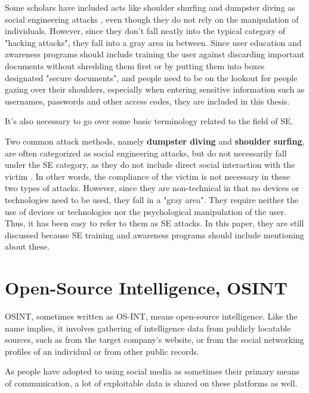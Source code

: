 Some scholars have included acts like shoulder shurfing and dumpster diving as social engineering attacks \citep{abiteboul}, even though they do not rely on the manipulation of individuals.  However, since they don't fall neatly into the typical category of "hacking attacks", they fall into a gray area in between. Since user education and awareness programs should include training the user against discarding important documents without shredding them first or by putting them into boxes designated "secure documents", and people need to be on the lookout for people gazing over their shoulders, especially when entering sensitive information such as usernames, passwords and other access codes, they are included in this thesis.

It's also necessary to go over some basic terminology related to the field of SE.

Two common attack methods, namely \textbf{dumpster diving} and \textbf{shoulder surfing}, are often categorized as social engineering attacks, but do not necessarily fall under the SE category, as they do not include direct social interaction with the victim \citep{wang_defining_2020}. In other words, the compliance of the victim is not necessary in these two types of attacks. However, since they are non-technical in that no devices or technologies need to be used, they fall in a "gray area". They require neither the use of devices or technologies nor the psychological manipulation of the user. Thus, it has been easy to refer to them as SE attacks. In this paper, they are still discussed because SE training and awareness programs should include mentioning about these.









\section{Open-Source Intelligence, OSINT}

OSINT, sometimes written as OS-INT, means open-source intelligence. Like the name implies, it involves gathering of intelligence data from publicly locatable sources, such as from the target company's website, or from the social networking profiles of an individual or from other public records.

As people have adopted to using social media as sometimes their primary means of communication, a lot of exploitable data is shared on these platforms as well.